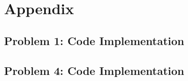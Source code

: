 \documentclass{article}
\begin{document}
\section*{Appendix}
\subsection*{Problem 1: Code Implementation}


\subsection*{Problem 4: Code Implementation}

\end{document}
